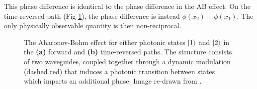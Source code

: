 This phase difference is identical to the phase difference in the AB effect. On the time-reversed path (Fig \ref{sfig:trab}), the phase difference is instead $\phi(x_2) - \phi(x_1)$. The only physically observable quantity is then non-reciprocal.

\begin{figure}[t]
	\centering
	\def\svgwidth{0.5\textwidth}
	\begin{subfigure}{0.5\textwidth}
		\def\svgwidth{0.95\textwidth}
		\centering
		\begin{normalsize}
			
		\end{normalsize}
		\subcaption{}
	\end{subfigure}%
	\begin{subfigure}{0.5\textwidth}
		\def\svgwidth{0.95\textwidth}
		\centering
		\begin{normalsize}
			
		\end{normalsize}
		\subcaption{}
		\label{sfig:trab}
	\end{subfigure}
	\caption[Aharonov-Bohm effect for photonic transitions]{The Aharonov-Bohm effect for either photonic states $\ket{1}$ and $\ket{2}$ in the \textbf{(a)} forward and \textbf{(b)} time-reversed paths. The structure consists of two waveguides, coupled together through a dynamic modulation (dashed red) that induces a photonic transition between states which imparts an additional phase. Image re-drawn from \cite{Fang2013}.}
	\label{fig:fangab}
\end{figure}
